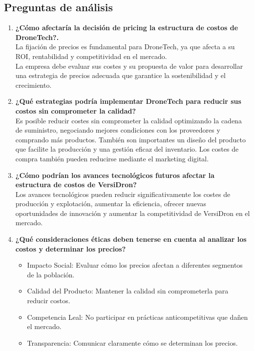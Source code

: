\documentclass[letterpaper,12pt]{article}
\begin{document}
\begin{sloppypar}
\subsection*{Preguntas de análisis}
\begin{enumerate}
    \item \textbf{¿Cómo afectaría la decisión de pricing la estructura de costos de
    DroneTech?.}\\ 
    La fijación de precios es fundamental para DroneTech, ya que afecta a su ROI, rentabilidad y competitividad en el mercado. 
    \vspace{0.3cm}\\ 
    La empresa debe evaluar sus costes y su propuesta de valor para desarrollar una estrategia de precios adecuada que garantice la sostenibilidad y el crecimiento.
    \item \textbf{¿Qué estrategias podría implementar DroneTech para reducir sus costos sin
    comprometer la calidad?} \\ Es posible reducir costes sin comprometer la calidad optimizando la cadena de suministro, negociando mejores condiciones con los proveedores y comprando más productos. También son importantes un diseño del producto que facilite la producción y una gestión eficaz del inventario. Los costes de compra también pueden reducirse mediante el marketing digital.
    \item \textbf{¿Cómo podrían los avances tecnológicos futuros afectar la estructura de costos de VersiDron? }\\ 
    Los avances tecnológicos pueden reducir significativamente los costes de producción y explotación, aumentar la eficiencia, ofrecer nuevas oportunidades de innovación y aumentar la competitividad de VersiDron en el mercado. 
    \item \textbf{¿Qué consideraciones éticas deben tenerse en cuenta al analizar los costos
    y determinar los precios?}
    \begin{itemize}
        \item Impacto Social: Evaluar cómo los precios afectan a diferentes segmentos de la población.
        \item Calidad del Producto: Mantener la calidad sin comprometerla para reducir costos.
        \item Competencia Leal: No participar en prácticas anticompetitivas que dañen el mercado.
        \item Transparencia: Comunicar claramente cómo se determinan los precios.
    \end{itemize}

\end{enumerate}
\end{sloppypar}
\end{document}
